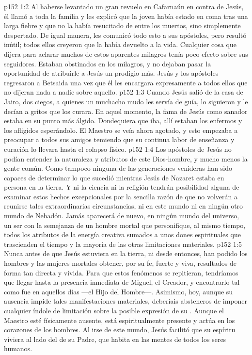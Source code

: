 \vs p152 1:2 Al haberse levantado un gran revuelo en Cafarnaún en contra de Jesús, él llamó a toda la familia y les explicó que la joven había estado en coma tras una larga fiebre y que no la había resucitado de entre los muertos, sino simplemente despertado. De igual manera, les comunicó todo esto a sus apóstoles, pero resultó inútil; todos ellos creyeron que la había devuelto a la vida. Cualquier cosa que dijera para aclarar muchos de estos aparentes milagros tenía poco efecto sobre sus seguidores. Estaban obstinados en los milagros, y no dejaban pasar la oportunidad de atribuirle a Jesús un prodigio más. Jesús y los apóstoles regresaron a Betsaida una vez que él les encargara expresamente a todos ellos que no dijeran nada a nadie sobre aquello.
\vs p152 1:3 \pc Cuando Jesús salió de la casa de Jairo, dos ciegos, a quienes un muchacho mudo les servía de guía, lo siguieron y le decían a gritos que los curara. En aquel momento, la fama de Jesús como sanador estaba en su punto más álgido. Dondequiera que iba, allí estaban los enfermos y los afligidos esperándolo. El Maestro se veía ahora agotado, y esto empezaba a preocupar a todos sus amigos temiendo que su continua labor de enseñanza y curación lo llevara hasta el colapso físico.
\vs p152 1:4 \pc Los apóstoles de Jesús no podían entender la naturaleza y atributos de este Dios\hyp{}hombre, y mucho menos la gente común. Como tampoco ninguna de las generaciones venideras han sido capaces de determinar lo que sucedió mientras Jesús de Nazaret estaba en persona en la tierra. Y ni la ciencia ni la religión tendrán posibilidad alguna de examinar estos hechos excepcionales por la sencilla razón de que no volverán a reunirse tales extraordinarias circunstancias, ni en este mundo ni en ningún otro mundo de Nebadón. Jamás aparecerá de nuevo, en ningún mundo del universo, un ser con la semejanza de un hombre mortal que personifique, al mismo tiempo, todos los atributos de la energía creativa sumados a unos dones espirituales que trascienden el tiempo y la mayoría de las otras limitaciones materiales.
\vs p152 1:5 Nunca antes de que Jesús estuviera en la tierra, ni desde entonces, han podido los hombres y las mujeres mortales obtener, por su fe, fuerte y viva, resultados de forma tan directa y vívida. Para que estos fenómenos se repitieran, tendríamos que llegar hasta la presencia inmediata de Miguel, el Creador, y encontrarlo tal como fue en aquellos días ---el Hijo del Hombre---. Asimismo, hoy, aunque su ausencia impide tales manifestaciones materiales, deberíais absteneros de imponer cualquier índole de limitación sobre la posible expresión de su . Aunque el Maestro esté físicamente ausente, está espiritualmente presente y actúa en los corazones de los hombres. Al irse de este mundo, Jesús facilitó que su espíritu viviera al lado del de su Padre, que habita en las mentes de todos los seres humanos.
